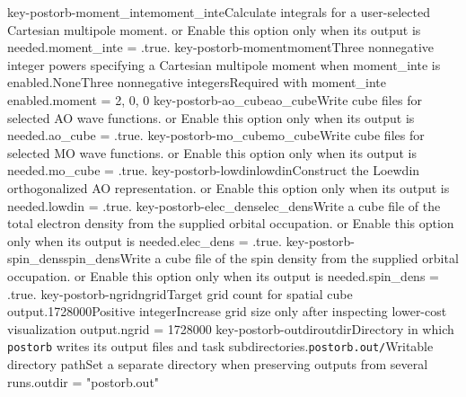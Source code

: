 \keyword
{key-postorb-moment_inte}{moment\_inte}{Calculate integrals for a user-selected Cartesian multipole moment.}{\OpOptional}{\OpLogic}{\OpFalse}{\OpTrue{} or \OpFalse}{Enable this option only when its output is needed.}{moment\_inte = .true.}
\keyword
{key-postorb-moment}{moment}{Three nonnegative integer powers specifying a Cartesian multipole moment when moment\_inte is enabled.}{\OpOptional}{\OpIntseq}{None}{Three nonnegative integers}{Required with moment\_inte enabled.}{moment = 2, 0, 0}
\keyword
{key-postorb-ao_cube}{ao\_cube}{Write cube files for selected AO wave functions.}{\OpOptional}{\OpLogic}{\OpFalse}{\OpTrue{} or \OpFalse}{Enable this option only when its output is needed.}{ao\_cube = .true.}
\keyword
{key-postorb-mo_cube}{mo\_cube}{Write cube files for selected MO wave functions.}{\OpOptional}{\OpLogic}{\OpFalse}{\OpTrue{} or \OpFalse}{Enable this option only when its output is needed.}{mo\_cube = .true.}
\keyword
{key-postorb-lowdin}{lowdin}{Construct the Loewdin orthogonalized AO representation.}{\OpOptional}{\OpLogic}{\OpFalse}{\OpTrue{} or \OpFalse}{Enable this option only when its output is needed.}{lowdin = .true.}
\keyword
{key-postorb-elec_dens}{elec\_dens}{Write a cube file of the total electron density from the supplied orbital occupation.}{\OpOptional}{\OpLogic}{\OpFalse}{\OpTrue{} or \OpFalse}{Enable this option only when its output is needed.}{elec\_dens = .true.}
\keyword
{key-postorb-spin_dens}{spin\_dens}{Write a cube file of the spin density from the supplied orbital occupation.}{\OpOptional}{\OpLogic}{\OpFalse}{\OpTrue{} or \OpFalse}{Enable this option only when its output is needed.}{spin\_dens = .true.}
\keyword
{key-postorb-ngrid}{ngrid}{Target grid count for spatial cube output.}{\OpOptional}{\OpInt}{1728000}{Positive integer}{Increase grid size only after inspecting lower-cost visualization output.}{ngrid = 1728000}
\keyword
{key-postorb-outdir}{outdir}{Directory in which \texttt{postorb} writes its output files and task subdirectories.}{\OpOptional}{\OpString}{\texttt{postorb.out/}}{Writable directory path}{Set a separate directory when preserving outputs from several runs.}{outdir = "postorb.out"}
